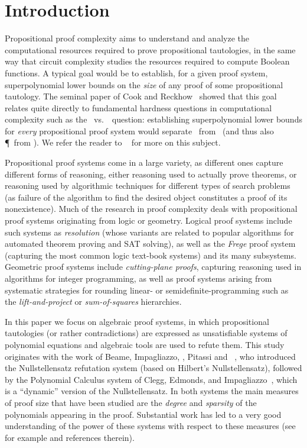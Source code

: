 \documentclass{toc}
\begin{document}
%
%
%
%
%

\sloppy %

\section{Introduction}

Propositional proof complexity aims to understand and analyze the computational resources required to prove propositional tautologies, in the same way that circuit complexity studies the resources required to compute Boolean functions. A typical goal would be to establish, for a given proof system, superpolynomial lower bounds on the \emph{size} of any proof of some propositional tautology. The seminal paper
of Cook and Reckhow~\cite{CookReckhow79} showed that this goal relates quite directly to fundamental hardness questions in computational complexity such as the \NP\ vs.~\coNP\ question: establishing superpolynomial lower bounds for \emph{every} propositional proof system would separate \NP\ from \coNP\ (and thus also \P\ from \NP). We refer the reader to \Krajicek~\cite{Krajicek95} for more on this subject. %

Propositional proof systems come in a large variety, as different ones capture different forms of reasoning, either reasoning used to actually prove theorems, or reasoning used by algorithmic techniques for different types of search problems (as failure of the algorithm to find the desired object constitutes a proof of its nonexistence). Much of the research in proof complexity deals with propositional proof systems originating from logic or geometry.  Logical proof systems include such systems as \emph{resolution} (whose variants are related to popular algorithms for automated theorem proving and SAT solving), as well as the \emph{Frege} proof system (capturing the most common logic text-book systems) and its many subsystems. Geometric proof systems include \emph{cutting-plane proofs}, capturing reasoning used in algorithms for integer programming, as well as proof systems arising from systematic strategies for rounding linear- or semidefinite-programming such as the \emph{lift-and-project} or \emph{sum-of-squares} hierarchies.

In this paper we focus on algebraic proof systems, in which propositional tautologies (or rather contradictions) are expressed as unsatisfiable systems of polynomial equations and algebraic tools are used to refute them. This study originates with the work of  Beame, Impagliazzo, \Krajicek, Pitassi and \Pudlak~\cite{BeameIKPP96}, who introduced the  Nullstellensatz refutation system (based on Hilbert's Nullstellensatz), followed by the Polynomial Calculus system of Clegg, Edmonds, and Impagliazzo~\cite{CleggEI96}, which is a ``dynamic'' version of the
Nullstellensatz. In both systems the main measures of proof size that have been studied are the \emph{degree} and \emph{sparsity} of the polynomials appearing in the proof. Substantial work has %
led  %
to a very good understanding of the power of these systems with respect to these measures (see for example \cite{BussIKPRS96,Razborov98,Grigoriev98,IPS99,BussGIP01,AlekhnovichRazborov01} and references therein).
\end{document}
